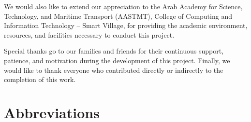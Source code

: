 \documentclass[12pt,a4paper,oneside]{report}
\begin{document}
We would also like to extend our appreciation to the Arab Academy for Science, Technology, and Maritime Transport (AASTMT), College of Computing and Information Technology -- Smart Village, for providing the academic environment, resources, and facilities necessary to conduct this project.

Special thanks go to our families and friends for their continuous support, patience, and motivation during the development of this project. Finally, we would like to thank everyone who contributed directly or indirectly to the completion of this work.

\tableofcontents
\listoffigures
\listoftables

\chapter*{Abbreviations}
\end{document}
